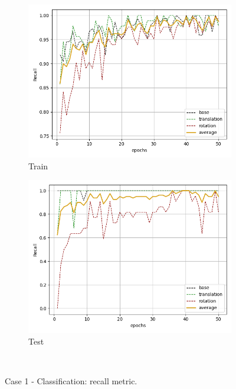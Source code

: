 \begin{figure}[H]
    \begin{subfigure}{.48\linewidth}
    \centering
    \includegraphics[scale=0.45]{Img/cls_nonoise_train_rec.png}
    \caption{Train}
    \end{subfigure}
    \begin{subfigure}{.48\linewidth}
    \centering
    \includegraphics[scale=0.45]{Img/cls_nonoise_test_rec.png}
    \caption{Test}
    \end{subfigure}\\
    \caption{Case 1 - Classification: recall metric. }
\end{figure}
